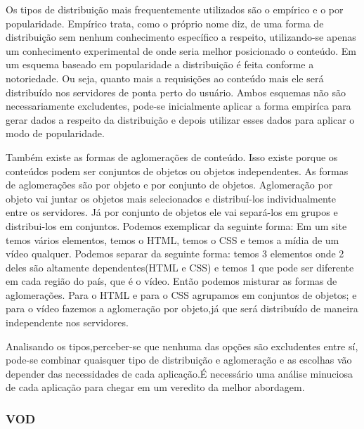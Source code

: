 Os tipos de distribui\c{c}\~ao mais frequentemente utilizados s\~ao o emp\'irico e o por popularidade.
\newline
Emp\'irico trata, como o pr\'oprio nome diz, de uma forma de distribui\c{c}\~ao sem nenhum conhecimento espec\'ifico a respeito, utilizando-se apenas um conhecimento experimental de onde seria melhor posicionado o conte\'udo.
\newline Em um esquema baseado em popularidade a distribui\c{c}\~ao \'e feita conforme a notoriedade. Ou seja, quanto mais a requisi\c{c}\~oes ao conte\'udo mais ele ser\'a distribu\'ido nos servidores de ponta perto do usu\'ario.
\newline Ambos esquemas n\~ao s\~ao necessariamente excludentes, pode-se inicialmente aplicar a forma empir\'ica para gerar dados a respeito da distribui\c{c}\~ao e depois utilizar esses dados para aplicar o modo de popularidade.
	
Tamb\'em existe as formas de aglomera\c{c}\~oes de conte\'udo. Isso existe porque os conte\'udos podem ser conjuntos de objetos ou objetos independentes. 
As formas de aglomera\c{c}\~oes s\~ao por objeto e por conjunto de objetos.
\newline
Aglomera\c{c}\~ao por objeto vai juntar os objetos mais selecionados e distribu\'i-los individualmente entre os servidores. J\'a por conjunto de objetos ele vai separ\'a-los em grupos e distribui-los em conjuntos. 
\newline Podemos exemplicar da seguinte forma: Em um site temos v\'arios elementos, temos o HTML, temos o CSS e temos a m\'idia de um v\'ideo qualquer. Podemos separar da seguinte forma: temos 3 elementos onde 2 deles s\~ao altamente dependentes(HTML e CSS) e temos 1 que pode ser diferente em cada regi\~ao do pa\'is, que \'e o v\'ideo. 
\newline Ent\~ao podemos misturar as formas de aglomera\c{c}\~oes. Para o HTML e para o CSS agrupamos em conjuntos de objetos; e para o v\'ideo fazemos a aglomera\c{c}\~ao por objeto,j\'a que ser\'a distribu\'ido de maneira independente nos servidores.

Analisando os tipos,perceber-se que nenhuma das op\c{c}\~oes s\~ao excludentes entre s\'i, pode-se combinar quaisquer tipo de distribui\c{c}\~ao e aglomera\c{c}\~ao e as escolhas v\~ao depender das necessidades de cada aplica\c{c}\~ao.\'E necess\'ario uma an\'alise minuciosa de cada aplica\c{c}\~ao para chegar em um veredito da melhor abordagem.
\subsubsection{VOD}
\label{subsec:vod}
